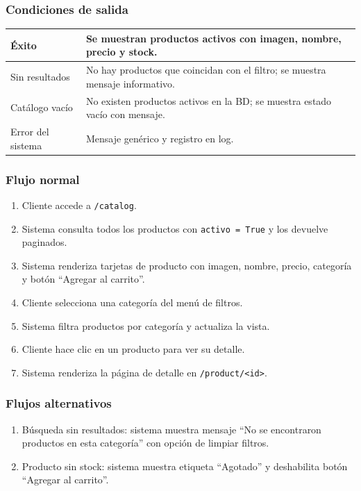\documentclass[12pt,a4paper]{article}
\begin{document}
\subsubsection*{Condiciones de salida}
\begin{longtable}{|l|p{10cm}|}
    \hline
    Éxito             & Se muestran productos activos con imagen, nombre, precio y stock.             \\ \hline
    Sin resultados    & No hay productos que coincidan con el filtro; se muestra mensaje informativo. \\ \hline
    Catálogo vacío    & No existen productos activos en la BD; se muestra estado vacío con mensaje.   \\ \hline
    Error del sistema & Mensaje genérico y registro en log.                                           \\ \hline
\end{longtable}

\subsubsection*{Flujo normal}
\begin{enumerate}[label=FN-\arabic*]
    \item Cliente accede a \texttt{/catalog}.
    \item Sistema consulta todos los productos con \texttt{activo = True} y los devuelve paginados.
    \item Sistema renderiza tarjetas de producto con imagen, nombre, precio, categoría y botón “Agregar al carrito”.
    \item Cliente selecciona una categoría del menú de filtros.
    \item Sistema filtra productos por categoría y actualiza la vista.
    \item Cliente hace clic en un producto para ver su detalle.
    \item Sistema renderiza la página de detalle en \texttt{/product/<id>}.
\end{enumerate}

\subsubsection*{Flujos alternativos}
\begin{enumerate}[label=FA-\arabic*]
    \item Búsqueda sin resultados: sistema muestra mensaje “No se encontraron productos en esta categoría” con opción de limpiar filtros.
    \item Producto sin stock: sistema muestra etiqueta “Agotado” y deshabilita botón “Agregar al carrito”.
\end{enumerate}
\end{document}

